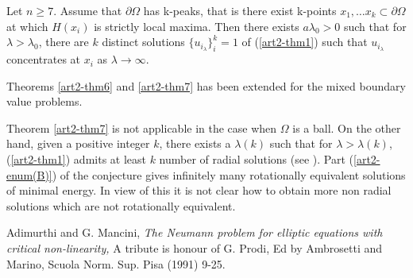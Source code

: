 \begin{theorem}\label{art2-thm7}
Let $n\geq 7$. Assume that $\partial \Omega$ has k-peaks, that is there exist k-points ${x_{1}, \ldots x_{k}} \subset \partial\Omega$ at which $H(x_{i})$ is strictly local maxima. Then there exists $a \lambda_{0} > 0$ such that for $\lambda > \lambda_{0}$, there are $k$ distinct solutions $\{u_{i_{\lambda}}\}_{i}^{k} = 1$ of (\ref{art2-thm1}) such that $u_{i_{\lambda}}$ concentrates at $x_{i}$ as $\lambda \rightarrow \infty$.
\end{theorem}
Theorems \ref{art2-thm6} and \ref{art2-thm7} has been extended for the mixed boundary value problems.

Theorem \ref{art2-thm7} is not applicable in the case when $\Omega$ is a ball. On the other hand, given a positive integer $k$, there exists a $\lambda(k)$ such that for $\lambda > \lambda(k)$, (\ref{art2-thm1}) admits at least $k$ number of radial solutions (see \cite{art2-key18}). Part (\ref{art2-enum(B)}) of the conjecture gives infinitely many rotationally equivalent solutions of minimal energy. In view of this it is not clear how to obtain more non radial solutions which are not rotationally equivalent. 
 
\begin{thebibliography}{99}
 Adimurthi and G. Mancini, \textit{The Neumann problem for elliptic equations with critical non-linearity,} A tribute is honour of G. Prodi, Ed by Ambrosetti and Marino, Scuola Norm. Sup. Pisa (1991) 9-25.
\end{thebibliography}
